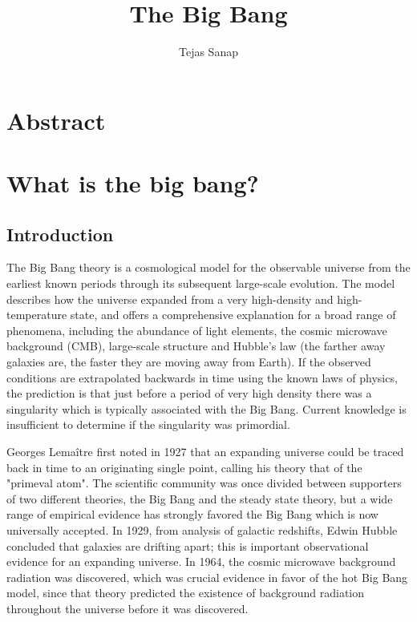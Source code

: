 \documentclass[14pt, oneside]{book}
\title{\large The Big Bang}
\author{Tejas Sanap}
\begin{document}
\frontmatter
	\maketitle
	\tableofcontents
	\listoffigures
	\listoftables
	\listoflistings

	\chapter*{Abstract}
		\blindtext

\mainmatter
		
	\chapter{What is the big bang?} %
		\section{Introduction}
		The Big Bang theory is a cosmological model for the observable universe from the earliest known periods through its subsequent large-scale evolution\cite{2004biba.book.....S}. The model describes how the universe expanded from a very high-density and high-temperature state, and offers a comprehensive explanation for a broad range of phenomena, including the abundance of light elements, the cosmic microwave background (CMB), large-scale structure and Hubble's law (the farther away galaxies are, the faster they are moving away from Earth). If the observed conditions are extrapolated backwards in time using the known laws of physics, the prediction is that just before a period of very high density there was a singularity which is typically associated with the Big Bang. Current knowledge is insufficient to determine if the singularity was primordial.
		
		Georges Lemaître first noted in 1927 that an expanding universe could be traced back in time to an originating single point, calling his theory that of the "primeval atom". The scientific community was once divided between supporters of two different theories, the Big Bang and the steady state theory, but a wide range of empirical evidence has strongly favored the Big Bang which is now universally accepted\cite{kragh1999cosmology}. In 1929, from analysis of galactic redshifts, Edwin Hubble concluded that galaxies are drifting apart; this is important observational evidence for an expanding universe. In 1964, the cosmic microwave background radiation was discovered, which was crucial evidence in favor of the hot Big Bang model\cite{partridge20073k}, since that theory predicted the existence of background radiation throughout the universe before it was discovered.
\end{document}
